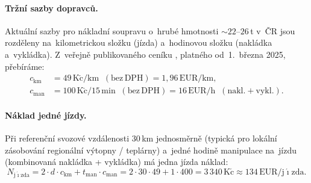 \paragraph{Tržní sazby dopravců.}
Aktuální sazby pro nákladní soupravu o~hrubé hmotnosti $\sim 22$--$26\,$t
v~ČR jsou rozděleny na~kilometrickou složku (jízda) a~hodinovou složku
(nakládka a~vykládka). Z~veřejně publikovaného ceníku
\citep{AKOBlatny2025}, platného od~1.~března 2025, přebíráme:
\begin{align}
c_\mathrm{km}   &= 49\,\mathrm{K\check{c}/km} \;\;(\mathrm{bez\,DPH})
                = 1{,}96\,\mathrm{EUR/km}, \label{eq:sazba_km} \\
c_\mathrm{man}  &= 100\,\mathrm{K\check{c}/15\,min} \;\;(\mathrm{bez\,DPH})
                = 16\,\mathrm{EUR/h} \;\;(\mathrm{nakl.+vykl.}). \label{eq:sazba_man}
\end{align}

\paragraph{Náklad jedné jízdy.}
Při referenční svozové vzdálenosti $30\,$km jednosměrně (typická pro
lokální zásobování regionální výtopny / teplárny) a~jedné hodině
manipulace na~jízdu (kombinovaná nakládka + vykládka) má jedna jízda
náklad:
\begin{equation}
N_\mathrm{j\acute{\imath}zda} = 2 \cdot d \cdot c_\mathrm{km}
                                + t_\mathrm{man} \cdot c_\mathrm{man}
                              = 2 \cdot 30 \cdot 49 + 1 \cdot 400
                              = 3\,340\,\mathrm{K\check{c}}
                              \approx 134\,\mathrm{EUR/j\acute{\imath}zda}.
\label{eq:naklad_jizdy}
\end{equation}

